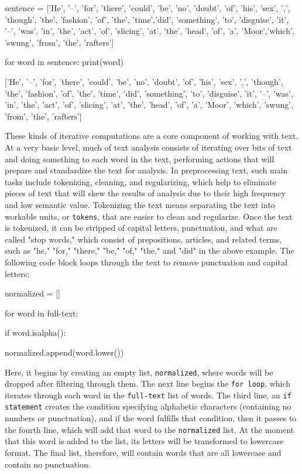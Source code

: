\documentclass[11pt]{article}
\begin{document}
\begin{SOURCE}
sentence = ['He', '--', 'for', 'there', 'could', 'be', 'no', 'doubt',
'of', 'his', 'sex', ',', 'though', 'the', 'fashion', 'of', 'the',
'time','did', 'something', 'to', 'disguise', 'it', '--', 'was', 'in',
'the', 'act', 'of', 'slicing', 'at', 'the', 'head', 'of', 'a',
'Moor','which', 'swung', 'from', 'the', 'rafters']

for word in sentence:
    print(word)

['He',
 '--',
 'for',
 'there',
 'could',
 'be',
 'no',
 'doubt',
 'of',
 'his',
 'sex',
 ',',
 'though',
 'the',
 'fashion',
 'of',
 'the',
 'time',
 'did',
 'something',
 'to',
 'disguise',
 'it',
 '--',
 'was',
 'in',
 'the',
 'act',
 'of',
 'slicing',
 'at',
 'the',
 'head',
 'of',
 'a',
 'Moor',
 'which',
 'swung',
 'from',
 'the',
 'rafters']
\end{SOURCE}

These kinds of iterative computations are a core component of working
with text. At a very basic level, much of text analysis consists of
iterating over bits of text and doing something to each word in the
text, performing actions that will prepare and standardize the text
for analysis. In preprocessing text, such main tasks include
tokenizing, cleaning, and regularizing, which help to eliminate pieces
of text that will skew the results of analysis due to their high
frequency and low semantic value. Tokenizing the text means separating
the text into workable units, or \texttt{tokens}, that are easier to clean
and regularize. Once the text is tokenized, it can be stripped of
capital letters, punctuation, and what are called "stop words," which
consist of prepositions, articles, and related terms, such as "he,"
"for," "there," "be," "of," "the," and "did" in the above example. The
following code block loops through the text to remove punctuation and
capital letters:

\begin{SOURCE}
normalized = []

for word in full-text:

if word.isalpha():

normalized.append(word.lower())
\end{SOURCE}

Here, it begins by creating an empty list, \texttt{normalized}, where
words will be dropped after filtering through them. The next line
begins the \texttt{for loop}, which iterates through each word in the
\texttt{full-text} list of words. The third line, an \texttt{if statement} creates
the condition specifying alphabetic characters (containing no numbers
or punctuation), and if the word fulfills that condition, then it
passes to the fourth line, which will add that word to the
\texttt{normalized} list. At the moment that this word is added to the
list, its letters will be transformed to lowercase format. The final
list, therefore, will contain words that are all lowercase and contain
no punctuation.
\end{document}
